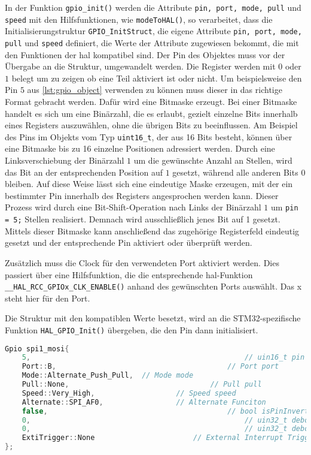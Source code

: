 In der Funktion \texttt{gpio\_init()} werden die Attribute \texttt{pin, port, mode, pull} und \texttt{speed} mit den Hilfsfunktionen, wie \texttt{modeToHAL()}, so verarbeitet, dass die Initialisierungstruktur \texttt{GPIO\_InitStruct}, die eigene Attribute \texttt{pin, port, mode, pull} und \texttt{speed} definiert, die Werte der Attribute zugewiesen bekommt, die mit den Funktionen der \gls{hal} kompatibel sind.
Der Pin des Objektes muss vor der Übergabe an die Struktur, umgewandelt werden.
Die Register werden mit $0$ oder $1$ belegt um zu zeigen ob eine Teil aktiviert ist oder nicht.
Um beispielsweise den Pin $5$ aus \cref{lst:gpio_object} verwenden zu können muss dieser in das richtige Format gebracht werden.
Dafür wird eine Bitmaske erzeugt. 
Bei einer Bitmaske handelt es sich um eine Binärzahl, die es erlaubt, gezielt einzelne Bits innerhalb eines Registers auszuwählen, ohne die übrigen Bits zu beeinflussen. 
Am Beispiel des Pins im Objekts vom Typ \texttt{uint16\_t}, der aus 16 Bits besteht, können über eine Bitmaske bis zu 16 einzelne Positionen adressiert werden. 
Durch eine Linksverschiebung der Binärzahl $1$ um die gewünschte Anzahl an Stellen, wird das Bit an der entsprechenden Position auf $1$ gesetzt, während alle anderen Bits $0$ bleiben. 
Auf diese Weise lässt sich eine eindeutige Maske erzeugen, mit der ein bestimmter Pin innerhalb des Registers angesprochen werden kann.
Dieser Prozess wird durch eine Bit-Shift-Operation nach Links der Binärzahl $1$ um \texttt{pin = 5;} Stellen realisiert. 
Demnach wird ausschließlich jenes Bit auf 1 gesetzt. 
Mittels dieser Bitmaske kann anschließend das zugehörige Registerfeld eindeutig gesetzt und der entsprechende Pin aktiviert oder überprüft werden.

Zusätzlich muss die Clock für den verwendeten Port aktiviert werden.
Dies passiert über eine Hilfsfunktion, die die entsprechende \gls{hal}-Funktion \texttt{\_\_HAL\_RCC\_GPIOx\_CLK\_ENABLE()} anhand des gewünschten Ports auswählt.
Das x steht hier für den Port.

Die Struktur mit den kompatiblen Werte besetzt, wird an die STM32-spezifische Funktion \texttt{HAL\_GPIO\_Init()} übergeben, die den Pin dann initialisiert.

\begin{lstlisting}[language=C++, caption={Beispiel eines Gpio Objektes.}, label={lst:gpio_object}]
Gpio spi1_mosi{
	5, 													// uin16_t pin
	Port::B, 										// Port port
	Mode::Alternate_Push_Pull,	// Mode mode
	Pull::None, 								// Pull pull
	Speed::Very_High, 					// Speed speed
	Alternate::SPI_AF0, 				// Alternate Funciton
	false, 											// bool isPinInverted
	0, 													// uin32_t debounceTime
	0, 													// uin32_t debounceState
	ExtiTrigger::None						// External Interrupt Trigger
};
\end{lstlisting}


